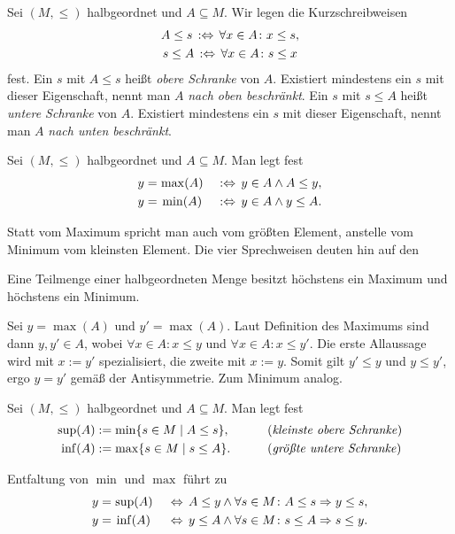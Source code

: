 \noindent
Sei $(M,\le)$ halbgeordnet und $A\subseteq M$. Wir legen die
Kurzschreibweisen
\begin{gather*}
A\le s\, :\Leftrightarrow\, \forall x\in A\colon x\le s,\\
s\le A\, :\Leftrightarrow\, \forall x\in A\colon s\le x
\end{gather*}
fest. Ein $s$ mit $A\le s$ heißt \emph{obere Schranke} von $A$. Existiert
mindestens ein $s$ mit dieser Eigenschaft, nennt man $A$ \emph{nach oben
beschränkt}. Ein $s$ mit $s\le A$ heißt \emph{untere Schranke} von $A$.
Existiert mindestens ein $s$ mit dieser Eigenschaft, nennt man $A$
\emph{nach unten beschränkt}.

\begin{Definition}\label{def:max-min}\newlinefirst
Sei $(M,\le)$ halbgeordnet und $A\subseteq M$. Man legt fest
\begin{alignat*}{3}
y = &\hspace{1.4pt}\max(A)\,\,&:\Leftrightarrow\, y\in A\land A\le y,\\
y = &\hspace{2.4pt}\min(A)\,\,&:\Leftrightarrow\, y\in A\land y\le A.
\end{alignat*}
\end{Definition}

\noindent
Statt vom Maximum spricht man auch vom größten Element,
anstelle vom Minimum vom kleinsten Element. Die vier Sprechweisen
deuten hin auf den

\begin{Satz}
Eine Teilmenge einer halbgeordneten Menge besitzt höchstens ein Maximum
und höchstens ein Minimum.
\end{Satz}
\begin{Beweis}
Sei $y=\max(A)$ und $y'=\max(A)$. Laut Definition des
Maximums sind dann $y,y'\in A$, wobei $\forall x\in A\colon x\le y$
und $\forall x\in A\colon x\le y'$. Die erste Allaussage wird
mit $x:=y'$ spezialisiert, die zweite mit $x:=y$. Somit
gilt $y'\le y$ und $y\le y'$, ergo $y=y'$ gemäß der Antisymmetrie.
Zum Minimum analog.\,\qedsymbol
\end{Beweis}

\begin{Definition}\newlinefirst
Sei $(M,\le)$ halbgeordnet und $A\subseteq M$. Man legt fest
\begin{alignat*}{2}
\sup(A) &:= \min\{s\in M\mid A\le s\},&&\qquad\text{(\emph{kleinste obere Schranke})}\\
\inf(A) &:= \max\{s\in M\mid s\le A\}.&&\qquad\text{(\emph{größte untere Schranke})}
\end{alignat*}
\end{Definition}
Entfaltung von $\min$ und $\max$ führt zu
\begin{alignat*}{2}
y = &\hspace{1.4pt}\sup(A)\, &&\Leftrightarrow\, A\le y\land\forall s\in M\colon A\le s\Rightarrow y\le s,\\
y = &\hspace{2.4pt}\inf(A)\, &&\Leftrightarrow\, y\le A\land\forall s\in M\colon s\le A\Rightarrow s\le y.
\end{alignat*}

